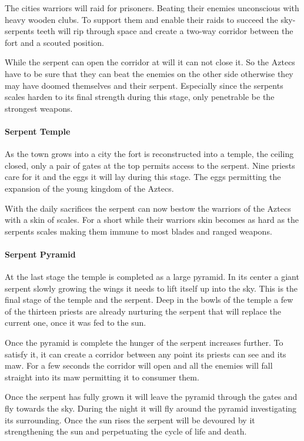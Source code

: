 \documentclass[a4paper]{book}
\begin{document}
				The cities warriors will raid for prisoners.
				Beating their enemies unconscious with heavy wooden clubs.
				To support them and enable their raids to succeed the sky-serpents
				teeth will rip through space and create a two-way corridor
				between the fort and a scouted position.

				While the serpent can open the corridor at will it can not close it.
				So the \gls{Aztecs} have to be sure that they can beat the enemies on
				the other side otherwise they may have doomed themselves and their serpent.
				Especially since the serpents scales harden to its final strength during this stage,
				only penetrable be the strongest weapons.

			\paragraph{Serpent Temple}
				As the town grows into a city the fort is reconstructed into a temple, the ceiling closed,
				only a pair of gates at the top permits access to the serpent.
				Nine priests care for it and the eggs it will lay during this stage.
				The eggs permitting the expansion of the young kingdom of the \gls{Aztecs}.

				With the daily sacrifices the serpent can now bestow the warriors of the \gls{Aztecs}
				with a skin of scales.
				For a short while their warriors skin becomes as hard as the serpents scales
				making them immune to most blades and ranged weapons.

			\paragraph{Serpent Pyramid}
				At the last stage the temple is completed as a large pyramid.
				In its center a giant serpent slowly growing the wings it needs to lift itself up into the sky.
				This is the final stage of the temple and the serpent.
				Deep in the bowls of the temple a few of the thirteen priests are already nurturing
				the serpent that will replace the current one,
				once it was fed to the sun.

				Once the pyramid is complete the hunger of the serpent increases further.
				To satisfy it, it can create a corridor between any point its priests can see
				and its maw.
				For a few seconds the corridor will open and all the enemies will fall straight into
				its maw permitting it to consumer them.

				Once the serpent has fully grown it will leave the pyramid through the gates and fly towards the sky.
				During the night it will fly around the pyramid investigating its surrounding.
				Once the sun rises the serpent will be devoured by it strengthening the sun and perpetuating the cycle
				of life and death.
\end{document}
